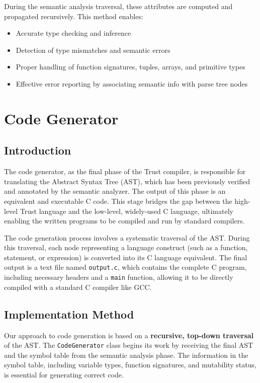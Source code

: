 \documentclass[12pt, a4paper]{report}
\begin{document}
During the semantic analysis traversal, these attributes are computed and propagated recursively. This method enables:

\begin{itemize}
    \item Accurate type checking and inference
    \item Detection of type mismatches and semantic errors
    \item Proper handling of function signatures, tuples, arrays, and primitive types
    \item Effective error reporting by associating semantic info with parse tree nodes
\end{itemize}



\chapter{Code Generator}

\section{Introduction}
The code generator, as the final phase of the Trust compiler, is responsible for translating the Abstract Syntax Tree (AST), which has been previously verified and annotated by the semantic analyzer. The output of this phase is an equivalent and executable C code. This stage bridges the gap between the high-level Trust language and the low-level, widely-used C language, ultimately enabling the written programs to be compiled and run by standard compilers.

The code generation process involves a systematic traversal of the AST. During this traversal, each node representing a language construct (such as a function, statement, or expression) is converted into its C language equivalent. The final output is a text file named \texttt{output.c}, which contains the complete C program, including necessary headers and a \texttt{main} function, allowing it to be directly compiled with a standard C compiler like GCC.

\section{Implementation Method}
Our approach to code generation is based on a \textbf{recursive, top-down traversal} of the AST. The \texttt{CodeGenerator} class begins its work by receiving the final AST and the symbol table from the semantic analysis phase. The information in the symbol table, including variable types, function signatures, and mutability status, is essential for generating correct code.
\end{document}
